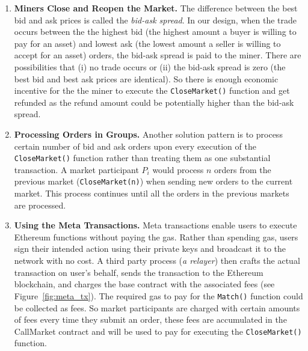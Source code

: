 \begin{enumerate}



\item \textbf {Miners Close and Reopen the Market.} The difference between the best bid and ask prices is called the \textit{bid-ask spread}. In our design, when the trade occurs between the the highest bid (the highest amount a buyer is willing to pay for an asset) and lowest ask (the lowest amount a seller is willing to accept for an asset) orders, the bid-ask spread is paid to the miner. There are possibilities that (i) no trade occurs or (ii) the bid-ask spread is zero (\ie the best bid and best ask prices are identical). So there is enough economic incentive for the the miner to execute the \texttt{CloseMarket()} function and get refunded as the refund amount could be potentially higher than the bid-ask spread. 




\item \textbf{Processing Orders in Groups.} Another solution pattern is to process certain number of bid and ask orders upon every execution of the \texttt{CloseMarket()} function rather than treating them as one substantial transaction. A market participant $P_i$ would process $n$ orders from the previous market (\texttt{CloseMarket(n)}) when sending new orders to the current market. This process continues until all the orders in the previous markets are processed. %
 




\item \textbf {Using the Meta Transactions.} Meta transactions enable users to execute Ethereum functions without paying the gas. Rather than spending gas, users sign their intended action using their private keys and broadcast it to the network with no cost. A third party process (\textit{a relayer}) then crafts the actual transaction on user's behalf, sends the transaction to the Ethereum blockchain, and charges the base contract with the associated fees (see Figure~\ref{fig:meta_tx}). The required gas to pay for the \texttt{Match()} function could be collected as fees. So market participants are charged with certain amounts of fees every time they submit an order, these fees are accumulated in the CallMarket contract and will be used to pay for executing the \texttt{CloseMarket()} function.


\end{enumerate}
